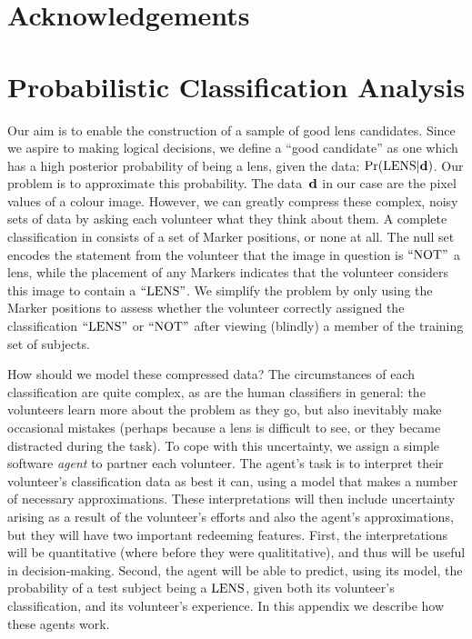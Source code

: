 \documentclass[useAMS,usenatbib,a4paper]{mn2e}
\begin{document}
\section*{Acknowledgements}
 



\appendix


\section{Probabilistic Classification Analysis}
\label{appendix:swap}

Our aim is to enable the construction of a sample of good lens candidates.
Since we aspire to making logical  decisions, we define a  ``good candidate''
as one which has a high posterior probability of being a lens, given the data:
${\rm Pr}({\rm LENS}|{\mathbf{d}})$. Our problem is to approximate this probability. The data~${\mathbf{d}}$
in our case are the pixel values of a colour image. However, we can greatly
compress these complex, noisy sets of data by asking each volunteer what they
think about them. A complete  classification in \sw consists of a set of
Marker positions, or none at all. The null set encodes the statement from
the volunteer that the image in question is ${\rm ``NOT"}$ a lens, while the
placement of any  Markers indicates that the volunteer considers this image to
contain a ${\rm ``LENS"}$.  We simplify the problem by only using the Marker
positions to assess whether the volunteer  correctly assigned the
classification ${\rm ``LENS"}$ or ${\rm ``NOT"}$ after viewing (blindly) a member of
the training set of subjects. 

How should we model these compressed data? The circumstances of each
classification are quite complex, as are the human classifiers in general: the
volunteers learn more about the problem as they go, but also inevitably make
occasional mistakes (perhaps because a lens is difficult to see, or they
became distracted during the task). To cope with this uncertainty, we assign a
simple software {\it agent} to partner each volunteer. The agent's task is to
interpret their volunteer's classification data as best it can, using a model
that makes a number of necessary approximations. These interpretations will
then include uncertainty arising as a result of the volunteer's efforts and
also the agent's approximations, but they will have two important redeeming
features. First, the interpretations will be quantitative (where before they
were qualititative),  and thus will be useful in decision-making. Second, the
agent will be able to predict, using its model, the probability of a test
subject being a ${\rm LENS}$, given both its volunteer's classification, and its
volunteer's experience. In this appendix we describe how these agents work.
\end{document}
